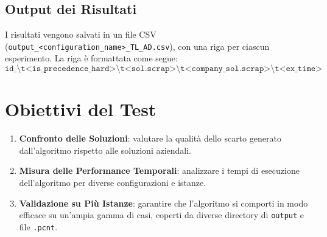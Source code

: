\subsection{Output dei Risultati}
I risultati vengono salvati in un file CSV (\texttt{output\_<configuration\_name>\_TL\_AD.csv}), con una riga per ciascun esperimento. La riga è formattata come segue:
\[
\texttt{id\_\textbackslash{}t<is\_precedence\_hard>\textbackslash{}t<sol.scrap>\textbackslash{}t<company\_sol.scrap>\textbackslash{}t<ex\_time>}
\]

\section{Obiettivi del Test}
\begin{enumerate}
    \item \textbf{Confronto delle Soluzioni}: valutare la qualità dello scarto generato dall'algoritmo rispetto alle soluzioni aziendali.
    \item \textbf{Misura delle Performance Temporali}: analizzare i tempi di esecuzione dell'algoritmo per diverse configurazioni e istanze.
    \item \textbf{Validazione su Più Istanze}: garantire che l'algoritmo si comporti in modo efficace su un'ampia gamma di casi, coperti da diverse directory di \texttt{output} e file \texttt{.pcnt}.
\end{enumerate}
